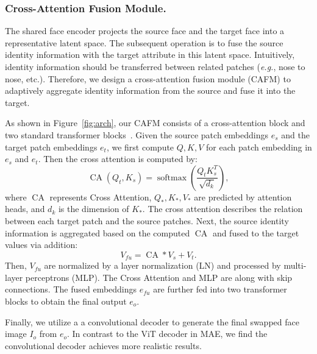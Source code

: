\subsubsection{Cross-Attention Fusion Module.}\label{para:cross_module}
The shared face encoder projects the source face and the target face into a representative latent space. The subsequent operation is to fuse the source identity information with the target attribute in this latent space. 
Intuitively, identity information should be transferred between related patches (\emph{e.g.}, nose to nose, etc.). Therefore, we design a cross-attention fusion module (CAFM) to adaptively aggregate identity information from the source and fuse it into the target.

As shown in Figure~\ref{fig:arch}, our CAFM consists of a cross-attention block and two standard transformer blocks~\cite{dosovitskiy2020vit}.
Given the source patch embeddings $e_{s}$ and the target patch embeddings $e_{t}$, we first compute $Q,K,V$ for each patch embedding in $e_{s}$ and $e_{t}$. Then the cross attention is computed by:
\begin{equation}
\operatorname{CA}(Q_t, K_s)=\operatorname{softmax}\left(\frac{Q_t K_s^{T}}{\sqrt{d_{k}}}\right),
\end{equation}
 where $\operatorname{CA}$ represents Cross Attention, $Q_*, K_*, V_*$ are predicted by attention heads, and $d_k$ is the dimension of $K_*$. 
 The cross attention describes the relation between each target patch and the source patches. 
 Next, the source identity information is aggregated based on the computed $\operatorname{CA}$ and fused to the target values via addition:
\begin{equation}
V_{fu}=\operatorname{CA} * V_s + V_t.
\end{equation}
 Then, $V_{fu}$ are normalized by a layer normalization (LN) and processed by multi-layer perceptrons (MLP). 
 The Cross Attention and MLP are along with skip connections. The fused embeddings $e_{fu}$ are further fed into two transformer blocks to obtain the final output $e_o$.

Finally, we utilize a a convolutional decoder to generate the final swapped face image $I_o$ from $e_o$. In contrast to the ViT decoder in MAE, we find the convolutional decoder achieves more realistic results.

